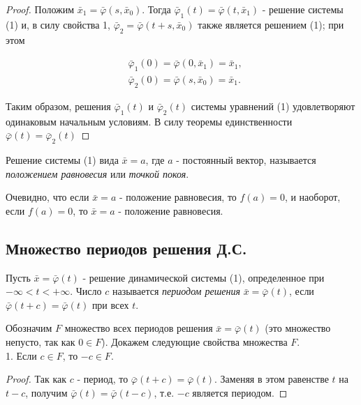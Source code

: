 \documentclass{article}
\theoremstyle{definition} \newtheorem*{theorem*}{Теорема}
\theoremstyle{plain} \newtheorem{theorem}{Теорема}[section]
\theoremstyle{definition} \newtheorem*{corollary*}{Следствие}
\theoremstyle{definition} \newtheorem{corollary}{Следствие}[section]
\begin{document}
\begin{proof}
Положим $\bar{x}_1 = \bar{\varphi}(s, \bar{x}_0)$.
Тогда $\bar{\varphi}_1(t) = \bar{\varphi}(t, \bar{x}_1)$
- решение системы (1) и, в силу свойства 1,
$\bar{\varphi}_2 = \bar{\varphi}(t + s, \bar{x}_0)$
также является решением (1); при этом

\begin{align*}
    &\bar{\varphi}_1(0)
    = \bar{\varphi}(0, \bar{x}_1)
    = \bar{x}_1,\\
    &\bar{\varphi}_2(0)
    = \bar{\varphi}(s, \bar{x}_0)
    = \bar{x}_1.
\end{align*}

Таким образом, решения $\bar{\varphi}_1(t)$ и
$\bar{\varphi}_2(t)$ системы уравнений (1) удовлетворяют
одинаковым начальным условиям. В силу теоремы единственности
$\bar{\varphi}(t) = \bar{\varphi}_2(t)$


\end{proof}

Решение системы (1) вида $\bar{x} = a$, где $a$
- постоянный вектор, называется
\textit{положением равновесия} или \textit{точкой покоя}.

Очевидно, что если $\bar{x} = a$ - положение равновесия,
то $f(a) = 0$, и наоборот,
если $f(a) = 0$, то $\bar{x} = a$ - положение равновесия.

\subsection*{Множество периодов решения Д.С.}

Пусть $\bar{x} = \bar{\varphi}(t)$ - решение динамической
системы (1), определенное при $- \infty < t < + \infty$.
Число $c$ называется \textit{периодом решения}
$\bar{x} = \bar{\varphi}(t)$, если $\bar{\varphi}(t + c) =
\bar{\varphi}(t)$ при всех $t$.

Обозначим $F$ множество всех периодов решения
$\bar{x} = \bar{\varphi}(t)$ (это множество непусто,
так как $0 \in F$). Докажем следующие свойства множества $F$.
\\

1. Если $c \in F$, то $-c \in F$.
\begin{proof}
Так как $c$ - период, то
$\bar{\varphi}(t + c) = \bar{\varphi}(t)$.
Заменяя в этом равенстве $t$ на $t - c$, получим
$\bar{\varphi}(t) = \bar{\varphi}(t - c)$,
т.е. $-c$ является периодом.
\end{proof}
\end{document}
